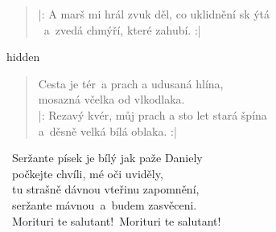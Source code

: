 \begin{song}{}
\begin{verse}
   |: A marš mi hrál zvuk děl, co uklidnění sk ýtá \\
      ~a~zvedá chmýří, které zahubí. :|
\end{verse}
\begin{optional}{hidden}
     
\end{optional}
\begin{verse}
   Cesta je tér~a prach a udusaná hlína, \\
   mosazná včelka od vlkodlaka. \\
   |: Rezavý kvér, můj prach a sto let stará špína \\
      a~děsně velká bílá oblaka. :|
\end{verse}
\begin{refren}
   ~Seržante písek je bílý jak paže Daniely \\
   ~počkejte chvíli, mé oči uviděly, \\
   ~tu strašně dávnou vteřinu zapomnění, \\
   ~seržante mávnou~a~budem zasvěceni. \\
   ~Morituri te salutant!~Morituri te salutant!
\end{refren}
\end{song}
\pagebreak
